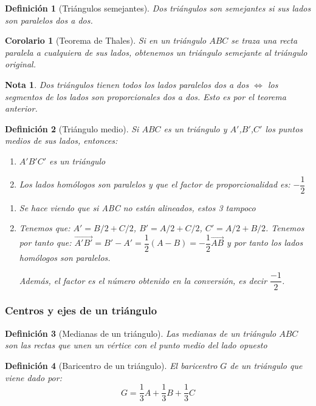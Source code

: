 \documentclass[11pt, a4paper, titlepage]{article}
\makeatletter
\renewenvironment{proof}[1][\proofname] {\vspace{-15pt}\par\pushQED{\qed}\normalfont\topsep6\p@\@plus6\p@\relax\trivlist\item[\hskip\labelsep\it#1\@addpunct{.}]\ignorespaces}{\popQED\endtrivlist\@endpefalse}
\renewcommand{\vec}{\overrightarrow}
\theoremstyle{theorem-style}
\newtheorem{ncor}{Corolario}
\theoremstyle{definition-style}
\newtheorem*{ndef}{Definición}
\theoremstyle{remark-style}
\newtheorem*{nota}{Nota}
\theoremstyle{example-style}
\newenvironment{nlist}
{\begin{enumerate}
\renewcommand\labelenumi{(\emph{\roman{enumi})}}}
{\end{enumerate}}
\makeatother
\begin{document}
\begin{ndef}[Triángulos semejantes]
	Dos triángulos son semejantes si sus lados son paralelos dos a dos.
\end{ndef}

\begin{ncor}[Teorema de Thales]
	Si en un triángulo $ABC$ se traza una recta paralela a cualquiera de sus lados, obtenemos un triángulo semejante al triángulo original.
\end{ncor}

\begin{nota}
	Dos triángulos tienen todos los lados paralelos dos a dos $\iff$ los segmentos de los lados son proporcionales dos a dos. Esto es por el teorema anterior.
\end{nota}

\begin{ndef}[Triángulo medio]
	Si $ABC$ es un triángulo y $A'$,$B'$,$C'$ los puntos medios de sus lados, entonces:
	\begin{nlist}
	\item $A'B'C'$ es un triángulo
	\item Los lados homólogos son paralelos y que el factor de proporcionalidad es: $-\dfrac{1}{2}$
\end{nlist}\vspace{0.2cm}
\begin{proof}

	\begin{nlist}
	\item Se hace viendo que si ABC no están alineados, estos 3 tampoco
	\item Tenemos que: $A' = B/2 + C/2$, $B' = A/2+C/2$, $C' = A/2 + B/2$. Tenemos por tanto que: $\vec{A'B'} = B'-A' = \dfrac{1}{2}(A-B) = -\dfrac{1}{2} \vec{AB}$ y por tanto los lados homólogos son paralelos.

Además, el factor es el número obtenido en la conversión, es decir $\dfrac{-1}{2}$.
\end{nlist}
\end{proof}
\end{ndef}


\subsubsection{Centros y ejes de un triángulo}

\begin{ndef}[Medianas de un triángulo]
Las medianas de un triángulo $ABC$ son las rectas que unen un vértice con el punto medio del lado opuesto
\end{ndef}
\begin{ndef}[Baricentro de un triángulo]
	El baricentro $G$ de un triángulo que viene dado por:
	\[
	G = \dfrac{1}{3} A +  \dfrac{1}{3} B +  \dfrac{1}{3} C
	\]
\end{ndef}
\end{document}
